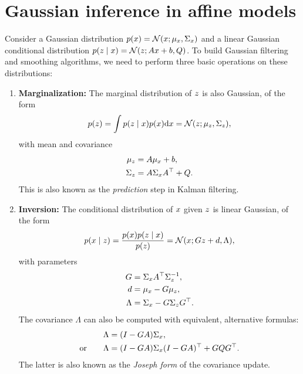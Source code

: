 \documentclass{mimosis}
\begin{document}
\section{Gaussian inference in affine models}
\label{sec:org41b6868}
\label{sec:affine-gaussian-inference}

Consider a Gaussian distribution
\(\p( \st ) = \N( \st; \mean{\st}, \cov{\st} )\)
and a linear Gaussian conditional distribution
\(\p( \obs \mid \st ) = \N( \obs; \transA \st + \transb, \transC )\).
To build Gaussian filtering and smoothing algorithms, we need to perform three basic operations on these distributions:

\begin{enumerate}
\item \textbf{Marginalization:}
The marginal distribution of \(z\) is also Gaussian, of the form
\begin{equation}
\p(\obs)
= \int \p(\obs \mid \st) \p(\st) \dd \st
= \N( \obs; \mean{\obs}, \cov{\obs} ),
\end{equation}
with mean and covariance
\begin{subequations}
\begin{align}
\mu_{z} &= A \mu_{x} + b, \\
\Sigma_{z} &= A \Sigma_{x} A^\top + Q.
\end{align}
\end{subequations}
This is also known as the \emph{prediction} step in Kalman filtering.

\item \textbf{Inversion:}
The conditional distribution of \(x\) given \(z\) is linear Gaussian, of the form
\begin{equation}
\p(\st \mid \obs)
= \frac{\p(\st) \p(\obs \mid \st)}{\p(\obs)}
= \N( \st; \invtransA \obs + \invtransb, \invtransC ),
\end{equation}
with parameters
\begin{subequations}\label{eq:gaussian-inversion-parameters}
\begin{align}
G &= \Sigma_{x} A^\top \Sigma_{z}^{-1}, \\
d &= \mu_{x} - G \mu_{z}, \\
\Lambda &= \Sigma_{x} - G \Sigma_{z} G^\top.
\end{align}
\end{subequations}
The covariance \(\Lambda\) can also be computed with equivalent, alternative formulas:
\begin{subequations}
\begin{align}
\Lambda &= (I - G A) \Sigma_{x}, \\ \text{or} \qquad
\Lambda &= (I - G A) \Sigma_{x} (I - G A)^\top + G Q G^\top.
\end{align}
\end{subequations}
The latter is also known as the \emph{Joseph form} of the covariance update.


\end{enumerate}
\end{document}
